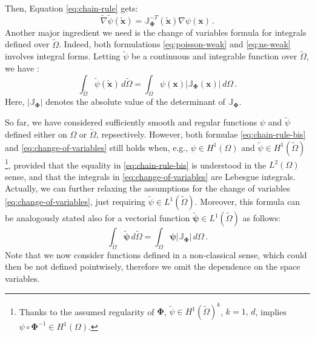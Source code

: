 \documentclass[12pt, a4paper, twoside, openright]{report}
\numberwithin{equation}{chapter}
\theoremstyle{theorem}
\theoremstyle{definition}
\theoremstyle{remark}
\theoremstyle{proposition}
\numberwithin{figure}{chapter}
\newcommand{\wt}[1]{\widetilde{#1}}
\newcommand{\bg}[1]{\boldsymbol{#1}}
\begin{document}
		Then, Equation \eqref{eq:chain-rule} gets:
		\begin{equation}
			\label{eq:chain-rule-bis}
			\wt{\nabla}{\wt{\psi}}(\wt{\bg{x}}) = \mathbb{J}_{\bg{\Phi}}^{-T} (\wt{\bg{x}}) \nabla{\psi}(\bg{x}) \, .
		\end{equation}  
		Another major ingredient we need is the change of variables formula for integrals defined over $\wt{\Omega}$. Indeed, both formulations \eqref{eq:poisson-weak} and \eqref{eq:ns-weak} involves integral forms. Letting $\wt{\psi}$ be a continuous and integrable function over $\wt{\Omega}$, we have \cite{Rud64}:
		\begin{equation}
			\label{eq:change-of-variables}
			\int_{\wt{\Omega}} \wt{\psi}(\wt{\bg{x}}) \, d \wt{\Omega} = \int_{\Omega} \psi(\bg{x}) \lvert \mathbb{J}_{\bg{\Phi}}(\bg{x}) \rvert \, d \Omega \, .
		\end{equation}
		Here, $\lvert \mathbb{J}_{\bg{\Phi}} \rvert$ denotes the absolute value of the determinant of $\mathbb{J}_{\bg{\Phi}}$.
		
		So far, we have considered sufficiently smooth and regular functions $\psi$ and $\wt{\psi}$ defined either on $\Omega$ or $\wt{\Omega}$, repsectively. However, both formulae \eqref{eq:chain-rule-bis} and \eqref{eq:change-of-variables} still holds when, e.g., $\psi \in H^1(\Omega)$ and $\wt{\psi} \in H^1(\wt{\Omega})$\footnote{Thanks to the assumed regularity of $\bg{\Phi}$, $\wt{\psi} \in H^1(\wt{\Omega})^k$, $k = 1, \, d$, implies $\psi \circ \bg{\Phi}^{-1} \in H^1(\Omega)$.}, provided that the equality in \eqref{eq:chain-rule-bis} is understood in the $L^2(\Omega)$ sense, and that the integrals in \eqref{eq:change-of-variables} are Lebesgue integrals. Actually, we can further relaxing the assumptions for the change of variables \eqref{eq:change-of-variables}, just requiring $\wt{\psi} \in L^1(\wt{\Omega})$. Moreover, this formula can be analogously stated also for a vectorial function $\wt{\bg{\psi}} \in L^1(\wt{\Omega})$ as follows:
		\begin{equation}
			\label{eq:change-of-variables-vectorial}
			\int_{\wt{\Omega}} \wt{\bg{\psi}} \, d \wt{\Omega} = \int_{\Omega} \bg{\psi} \lvert \mathbb{J}_{\bg{\Phi}} \rvert \, d \Omega \, .
		\end{equation}
		Note that we now consider functions defined in a non-classical sense, which could then be not defined pointwisely, therefore we omit the dependence on the space variables.
		
\end{document}
